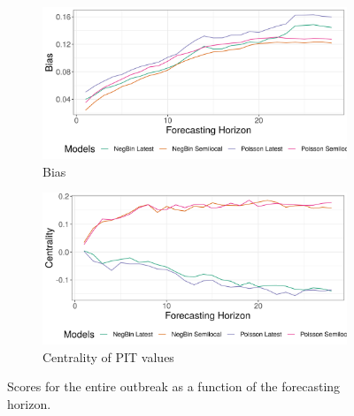 \begin{figure}[H]
\begin{subfigure}{0.5\textwidth}
  \centering
  \includegraphics[width=\linewidth]{../output/Mandima_bias.png}  
  \caption{Bias}
  \label{fig:sub-third}
\end{subfigure}
\begin{subfigure}{0.5\textwidth}
  \centering
  \includegraphics[width=\linewidth]{../output/Mandima_centrality.png}  
  \caption{Centrality of PIT values}
  \label{fig:nat_scores_4}
\end{subfigure}
  \caption{Scores for the entire outbreak as a function of the forecasting horizon.}

  \label{fig:nat_scores}
\end{figure}
